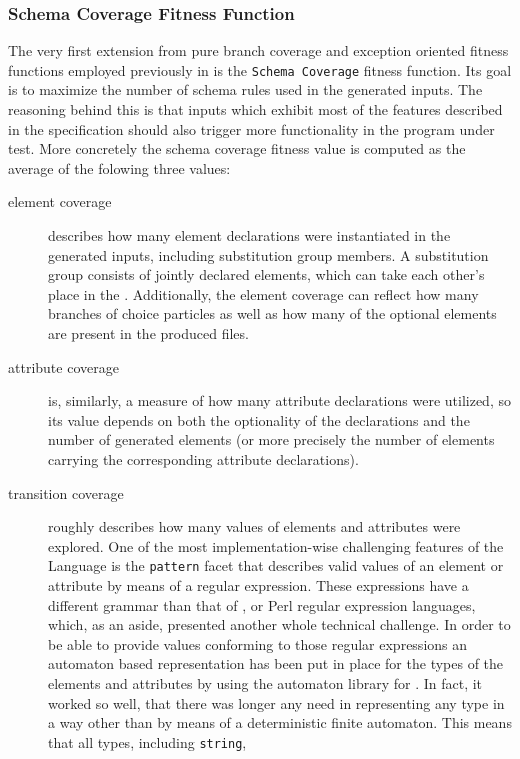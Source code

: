 \subsubsection{Schema Coverage Fitness Function}
\label{sec:fit:schema}
The very first extension from pure \java branch coverage and exception oriented fitness functions employed 
previously in \xmlmate is the \texttt{Schema Coverage} fitness function. Its goal is to maximize the number 
of schema rules used in the generated inputs. The reasoning behind this is that inputs which exhibit most of 
the features described in the specification should also trigger more functionality in the program under test. 
More concretely the schema coverage fitness value is computed as the average of the folowing three values:
\begin{description}
  \item[element coverage] describes how many element declarations were instantiated in the generated inputs, 
  including substitution group members. A substitution group consists of jointly declared elements, which 
  can take each other's place in the \xml. Additionally, the element coverage can reflect how many branches 
  of choice particles as well as how many of the optional elements are present in the produced files.
  \item[attribute coverage] is, similarly, a measure of how many attribute declarations were utilized, so its 
  value depends on both the optionality of the declarations and the number of generated elements (or more 
  precisely the number of elements carrying the corresponding attribute declarations).
  \item[transition coverage] roughly describes how many values of elements and attributes were explored. One of
  the most implementation-wise challenging features of the \xsd{} {\small Language} is the \texttt{pattern}
  facet that describes valid values of an element or attribute by means of a regular expression. These
  expressions have a different grammar than that of \java, \python or {\small Perl} regular expression
  languages, which, as an aside, presented another whole technical challenge.
  In order to be able to provide values conforming to those regular expressions an automaton based representation 
  has been put in place for the types of the elements and attributes by using the automaton
  library\cite{automaton} for \java.
  In fact, it worked so well, that there was longer any need in representing any type in a way other than by
  means of a deterministic finite automaton. This means that all types, including \texttt{string},

\end{description}
